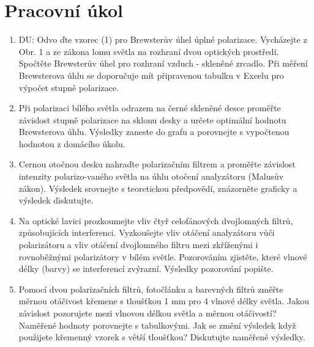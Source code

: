 \section{Pracovní úkol}
\begin{enumerate}
\item DU: Odvo ďte vzorec (1) pro Brewsterův úhel úplné polarizace. Vycházejte z Obr. 1 a ze zákona lomu světla na rozhraní dvou optických prostředí. Spočtěte
Brewsterův úhel pro rozhraní vzduch - skleněné zrcadlo. Při měření Brewsterova
úhlu se doporučuje mít připravenou tabulku v Excelu pro výpočet stupně polarizace.
\item Při polarizaci bílého světla odrazem na černé skleněné desce proměřte závislost stupně polarizace
na sklonu desky a určete optimální hodnotu Brewsterova úhlu. Výsledky zaneste do grafu
a porovnejte s vypočtenou hodnotou z domácího úkolu.
\item Cernou otočnou desku nahraďte polarizačním filtrem a proměřte závislost intenzity polarizo-vaného světla na úhlu otočení analyzátoru (Malusův zákon). Výsledek srovnejte s teoretickou
předpovědí, znázorněte graficky a výsledek diskutujte.
\item Na optické lavici prozkoumejte vliv čtyř celofánových dvojlomných filtrů, způsobujících interferenci.
Vyzkoušejte vliv otáčení analyzátoru vůči polarizátoru a vliv otáčení dvojlomného filtru
mezi zkříženými i rovnoběžnými polarizátory v bílém světle. Pozorováním zjistěte, které vlnové
délky (barvy) se interferencí zvýrazní. Výsledky pozorování popište.
\item Pomocí dvou polarizačních filtrů, fotočlánku a barevných filtrů změřte měrnou otáčivost
křemene s tloušťkou 1 mm pro 4 vlnové délky světla. Jakou závislost pozorujete mezi vlnovou
délkou světla a měrnou otáčivostí? Naměřené hodnoty porovnejte s tabulkovými. Jak se změní
výsledek když použijete křemenný vzorek s větší tloušťkou? Diskutujte naměřené výsledky.
\end{enumerate}

